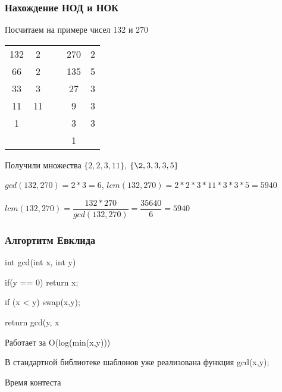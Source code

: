 
\begin{frame}
	\frametitle{Нахождение НОД и НОК}
    
    \quad Посчитаем на примере чисел 132 и 270\\

    \begin{tabular}{c|ccc|c}
        132 & 2  & ~ & 270 & 2\\
        66  & 2  & ~ & 135 & 5 \\
        33  & 3  & ~ & 27  & 3 \\
        11  & 11 & ~ & 9   & 3 \\
        1   & ~  & ~ & 3   & 3 \\
        ~   & ~  & ~ & 1   & 
    \end{tabular}
    
    \quad Получили множества $\{2,2,3,11\}$, $\{\2,3,3,3,5\}$

    \quad $gcd(132,270) = 2*3 = 6$, $lcm(132,270) = 2*2*3*11*3*3*5=5940$

    \quad $lcm(132,270) = \dfrac{132*270}{gcd(132,270)} = \dfrac{35640}{6}=5940$

\end{frame}


\begin{frame}[fragile]
	\frametitle{Алгортитм Евклида}

\begin{cpp}
int gcd(int x, int y){
    if(y == 0){
        return x;
    }

    if (x < y){
        swap(x,y);
    }

    return gcd(y, x%
}
\end{cpp}

\quad Работает за O(log(min(x,y)))

\quad В стандартной библиотеке шаблонов уже реализована функция gcd(x,y);

\end{frame}


\begin{frame}
    \center \Huge Время контеста 
\end{frame}


